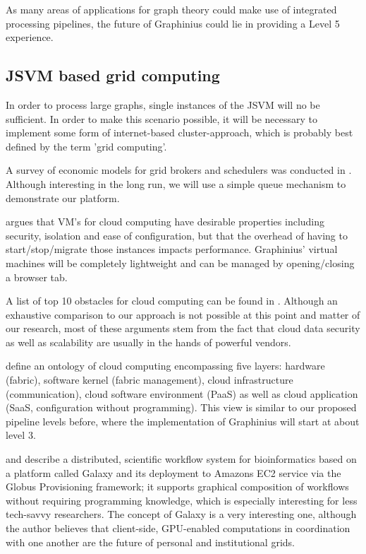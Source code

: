 As many areas of applications for graph theory could make use of integrated processing pipelines, the future of Graphinius could lie in providing a Level 5 experience.


\subsection{JSVM based grid computing}
\label{ssect:jsvm_grid}

In order to process large graphs, single instances of the JSVM will no be sufficient. In order to make this scenario possible, it will be necessary to implement some form of internet-based cluster-approach, which is probably best defined by the term 'grid computing'.

A survey of economic models for grid brokers and schedulers was conducted in \citep{Abramson2002}. Although interesting in the long run, we will use a simple queue mechanism to demonstrate our platform.

\citep{Huang2006} argues that VM's for cloud computing have desirable properties including security, isolation and ease of configuration, but that the overhead of having to start/stop/migrate those instances impacts performance. Graphinius' virtual machines will be completely lightweight and can be managed by opening/closing a browser tab.

A list of top 10 obstacles for cloud computing can be found in \citep{Armbrust2010}. Although an exhaustive comparison to our approach is not possible at this point and matter of our research, most of these arguments stem from the fact that cloud data security as well as scalability are usually in the hands of powerful vendors.

\citep{Youseff2008} define an ontology of cloud computing encompassing five layers: hardware (fabric), software kernel (fabric management), cloud infrastructure (communication), cloud software environment (PaaS) as well as cloud application (SaaS, configuration without programming). This view is similar to our proposed pipeline levels before, where the implementation of Graphinius will start at about level 3.

\citep{Liu2012} and \citep{Liu2014} describe a distributed, scientific workflow system for bioinformatics based on a platform called Galaxy and its deployment to Amazons EC2 service via the Globus Provisioning framework; it supports graphical composition of workflows without requiring programming knowledge, which is especially interesting for less tech-savvy researchers. The concept of Galaxy is a very interesting one, although the author believes that client-side, GPU-enabled computations in coordination with one another are the future of personal and institutional grids.


